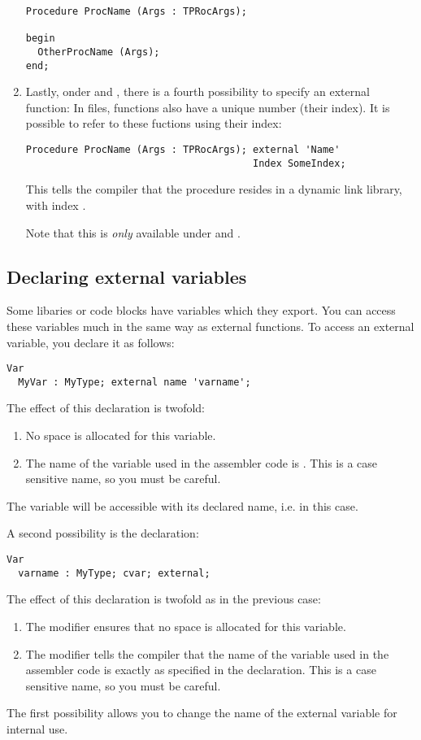 \begin{enumerate}
\begin{verbatim}
Procedure ProcName (Args : TPRocArgs);

begin
  OtherProcName (Args);
end;
\end{verbatim}
\item Lastly, onder \windows and \ostwo, there is a fourth possibility
to specify an external function: In  files, functions also have
a unique number (their index). It is possible to refer to these fuctions
using their index:
\begin{verbatim}
Procedure ProcName (Args : TPRocArgs); external 'Name' 
                                       Index SomeIndex;
\end{verbatim}
This tells the compiler that the procedure  resides in a
dynamic link library, with index .

\begin{remark}Note that this is {\em only} available under \windows and \ostwo.
\end{remark}
\end{enumerate}

\subsection{Declaring external variables}
\label{se:ExternalVars}

Some libaries or code blocks have variables which they export. You can access
these variables much in the same way as external functions. To access an
external variable, you declare it as follows:

\begin{verbatim}
Var
  MyVar : MyType; external name 'varname';
\end{verbatim}
The effect of this declaration is twofold:
\begin{enumerate}
\item No space is allocated for this variable.
\item The name of the variable used in the assembler code is .
This is a case sensitive name, so you must be careful.
\end{enumerate}
The variable will be
accessible with its declared name, i.e.  in this case.

A second possibility is the declaration:
\begin{verbatim}
Var
  varname : MyType; cvar; external;
\end{verbatim}
The effect of this declaration is twofold as in the previous case:
\begin{enumerate}
\item The  modifier ensures that no space is allocated for
this variable.
\item The  modifier tells the compiler that the name of the
variable used in the assembler code is exactly as specified in the
declaration. This is a case sensitive name, so you must be careful.
\end{enumerate}
The first possibility allows you to change the name of the
external variable for  internal use.

